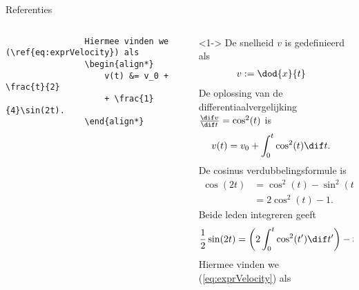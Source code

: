 \begin{frame}[fragile,t]{Referenties}
\begin{columns}[t]
\begin{column}{0.5\textwidth}
\begin{verbatim}
                Hiermee vinden we (\ref{eq:exprVelocity}) als
                \begin{align*}
                    v(t) &= v_0 + \frac{t}{2}
                    + \frac{1}{4}\sin(2t).
                \end{align*}
            \end{verbatim}
        \end{column}
        \begin{column}{0.5\textwidth}
            \begin{adjustbox}{frame=1pt 10pt,valign=t}%
                \begin{minipage}{\textwidth-22pt}
                    \begin{onlyenv}<1->%
                        {\tiny\setlength{\abovedisplayskip}{3pt}%
                            \setlength{\belowdisplayskip}{3pt}%
                            \setlength{\abovedisplayshortskip}{0pt}%
                            \setlength{\belowdisplayshortskip}{0pt}%
                            \setcounter{equation}{0}%
                            De snelheid $ v $ is gedefinieerd als
                            \begin{align}
                                v &:= \dod{x}{t}
                            \end{align}
                            De oplossing van de differentiaalvergelijking $ \frac{\dif v}{\dif t} = \cos^2(t) $ is
                            \begin{align}
                                v(t) & = v_0 + \int_{0}^{t}\cos^2(t)\dif t.
                                \label{eq:exprVelocity}
                            \end{align}
                            De cosinus verdubbelingsformule is
                            \begin{align*}
                                \cos(2t) & = \cos^2(t) - \sin^2(t) \\
                                         & = 2\cos^2(t)-1.
                            \end{align*}
                            Beide leden integreren geeft
                            \begin{align*}
                                \frac{1}{2}\sin(2t) & = \left(2\int_0^t\cos^2(t')\dif t'\right) - t.
                            \end{align*}
                            Hiermee vinden we (\ref{eq:exprVelocity}) als
                            \begin{align*}

\end{align*}}
\end{onlyenv}
\end{minipage}
\end{adjustbox}
\end{column}
\end{columns}
\end{frame}
